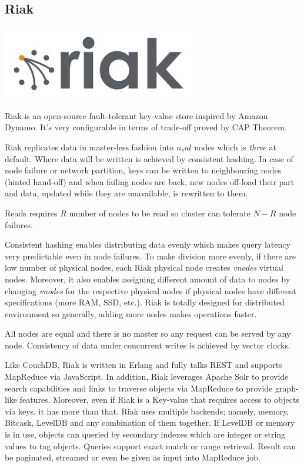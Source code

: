 \subsection{Riak}

\vspace{-1.15cm} \hspace{2.7cm} \includegraphics[scale=0.2]{3/figures/riak.jpg}

Riak is an open-source fault-tolerant key-value store inspired by Amazon Dynamo. It's very configurable in terms of trade-off proved by CAP Theorem.

Riak replicates data in master-less fashion into $n_val$ nodes which is \textit{three} at default. Where data will be written is achieved by consistent hashing. In case of node failure or network partition, keys can be written to neighbouring nodes (hinted hand-off) and when failing nodes are back, new nodes off-load their part and data, updated while they are unavailable, is rewritten to them.

Reads requires $R$ number of nodes to be read so cluster can tolerate $N - R$ node failures.

Consistent hashing enables distributing data evenly which makes query latency very predictable even in node failures. To make division more evenly, if there are low number of physical nodes, each Riak physical node creates \textit{vnodes} virtual nodes. Moreover, it also enables assigning different amount of data to nodes by changing \textit{vnodes} for the respective physical nodes if physical nodes have different specifications (more RAM, SSD, etc.). Riak is totally designed for distributed environment so generally, adding more nodes makes operations faster.

All nodes are equal and there is no master so any request can be served by any node. Consistency of data under concurrent writes is achieved by vector clocks.

Like CouchDB, Riak is written in Erlang and fully talks REST and supports MapReduce via JavaScript. In addition, Riak leverages Apache Solr to provide search capabilities and links to traverse objects via MapReduce to provide graph-like features. Moreover, even if Riak is a Key-value that requires access to objects via keys, it has more than that. Riak uses multiple backends; namely, memory, Bitcask, LevelDB and any combination of them together. If LevelDB or memory is in use, objects can queried by secondary indexes which are integer or string values to tag objects. Queries support exact match or range retrieval. Result can be paginated, streamed or even be given as input into MapReduce job.

